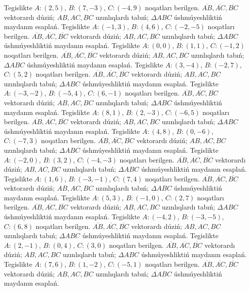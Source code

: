 Tegislikte $A: (2, 5)$, $B: (7, -3)$, $C: (-4, 9)$ noqatları berilgen. $\overline{AB}, \overline{AC}, \overline{BC}$ vektorardı dúziń; $AB, AC, BC$ uzınlıqlardı tabıń; $\Delta ABC$ úshmúyeshliktiń maydanın esaplań. 
Tegislikte $A: (-1, 3)$, $B: (4, 6)$, $C: (-2, -5)$ noqatları berilgen. $\overline{AB}, \overline{AC}, \overline{BC}$ vektorardı dúziń; $AB, AC, BC$ uzınlıqlardı tabıń; $\Delta ABC$ úshmúyeshliktiń maydanın esaplań. 
Tegislikte $A: (0, 0)$, $B: (1, 1)$, $C: (-1, 2)$ noqatları berilgen. $\overline{AB}, \overline{AC}, \overline{BC}$ vektorardı dúziń; $AB, AC, BC$ uzınlıqlardı tabıń; $\Delta ABC$ úshmúyeshliktiń maydanın esaplań. 
Tegislikte $A: (3, -4)$, $B: (-2, 7)$, $C: (5, 2)$ noqatları berilgen. $\overline{AB}, \overline{AC}, \overline{BC}$ vektorardı dúziń; $AB, AC, BC$ uzınlıqlardı tabıń; $\Delta ABC$ úshmúyeshliktiń maydanın esaplań. 
Tegislikte $A: (-3, -2)$, $B: (-5, 4)$, $C: (6, -1)$ noqatları berilgen. $\overline{AB}, \overline{AC}, \overline{BC}$ vektorardı dúziń; $AB, AC, BC$ uzınlıqlardı tabıń; $\Delta ABC$ úshmúyeshliktiń maydanın esaplań. 
Tegislikte $A: (8, 1)$, $B: (2, -3)$, $C: (-6, 5)$ noqatları berilgen. $\overline{AB}, \overline{AC}, \overline{BC}$ vektorardı dúziń; $AB, AC, BC$ uzınlıqlardı tabıń; $\Delta ABC$ úshmúyeshliktiń maydanın esaplań. 
Tegislikte $A: (4, 8)$, $B: (0, -6)$, $C: (-7, 3)$ noqatları berilgen. $\overline{AB}, \overline{AC}, \overline{BC}$ vektorardı dúziń; $AB, AC, BC$ uzınlıqlardı tabıń; $\Delta ABC$ úshmúyeshliktiń maydanın esaplań. 
Tegislikte $A: (-2, 0)$, $B: (3, 2)$, $C: (-4, -3)$ noqatları berilgen. $\overline{AB}, \overline{AC}, \overline{BC}$ vektorardı dúziń; $AB, AC, BC$ uzınlıqlardı tabıń; $\Delta ABC$ úshmúyeshliktiń maydanın esaplań. 
Tegislikte $A: (1, 6)$, $B: (-3, -1)$, $C: (7, 4)$ noqatları berilgen. $\overline{AB}, \overline{AC}, \overline{BC}$ vektorardı dúziń; $AB, AC, BC$ uzınlıqlardı tabıń; $\Delta ABC$ úshmúyeshliktiń maydanın esaplań. 
Tegislikte $A: (5, 3)$, $B: (-1, 0)$, $C: (2, 7)$ noqatları berilgen. $\overline{AB}, \overline{AC}, \overline{BC}$ vektorardı dúziń; $AB, AC, BC$ uzınlıqlardı tabıń; $\Delta ABC$ úshmúyeshliktiń maydanın esaplań. 
Tegislikte $A: (-4, 2)$, $B: (-3, -5)$, $C: (6, 8)$ noqatları berilgen. $\overline{AB}, \overline{AC}, \overline{BC}$ vektorardı dúziń; $AB, AC, BC$ uzınlıqlardı tabıń; $\Delta ABC$ úshmúyeshliktiń maydanın esaplań. 
Tegislikte $A: (2, -1)$, $B: (0, 4)$, $C: (3, 0)$ noqatları berilgen. $\overline{AB}, \overline{AC}, \overline{BC}$ vektorardı dúziń; $AB, AC, BC$ uzınlıqlardı tabıń; $\Delta ABC$ úshmúyeshliktiń maydanın esaplań. 
Tegislikte $A: (7, 6)$, $B: (1, -2)$, $C: (-5, 1)$ noqatları berilgen. $\overline{AB}, \overline{AC}, \overline{BC}$ vektorardı dúziń; $AB, AC, BC$ uzınlıqlardı tabıń; $\Delta ABC$ úshmúyeshliktiń maydanın esaplań. 
